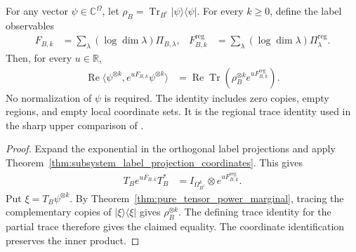 \begin{theorem}
    \label{thm:subsystem_label_exponential_regional_trace}
    \leanok
    For any vector $\psi\in\mathbb C^\Omega$, let
    $\rho_B=\operatorname{Tr}_{B^c}|\psi\rangle\langle\psi|$.
    For every $k\ge0$, define the label observables
    \begin{align}
        F_{B,k} & =\sum_\lambda(\log\dim\lambda)\Pi_{B,\lambda},
                & F^{\mathrm{reg}}_{B,k}
                & =\sum_\lambda(\log\dim\lambda)\Pi^{\mathrm{reg}}_\lambda.
    \end{align}
    Then, for every $u\in\mathbb R$,
    \begin{align}
        \operatorname{Re}\langle\psi^{\otimes k},
        e^{uF_{B,k}}\psi^{\otimes k}\rangle
         & =\operatorname{Re}\operatorname{Tr}\!\left(
        \rho_B^{\otimes k}e^{uF^{\mathrm{reg}}_{B,k}}\right).
    \end{align}
    No normalization of $\psi$ is required. The identity includes zero
    copies, empty regions, and empty local coordinate sets. It is the
    regional trace identity used in the sharp upper comparison of
    \cite[Section~8]{OpenAI2026AreaLaw}.
\end{theorem}
\begin{proof}
    \leanok
    Expand the exponential in the orthogonal label projections and apply
    Theorem~\ref{thm:subsystem_label_projection_coordinates}. This gives
    \begin{align}
        T_B e^{uF_{B,k}}T_B^*
         & =I_{\Omega_{B^c}^k}\otimes e^{uF^{\mathrm{reg}}_{B,k}}.
    \end{align}
    Put $\xi=T_B\psi^{\otimes k}$. By
    Theorem~\ref{thm:pure_tensor_power_marginal}, tracing the complementary
    copies of $|\xi\rangle\langle\xi|$ gives $\rho_B^{\otimes k}$.
    The defining trace identity for the partial trace therefore gives the
    claimed equality. The coordinate identification preserves the inner
    product.
\end{proof}

